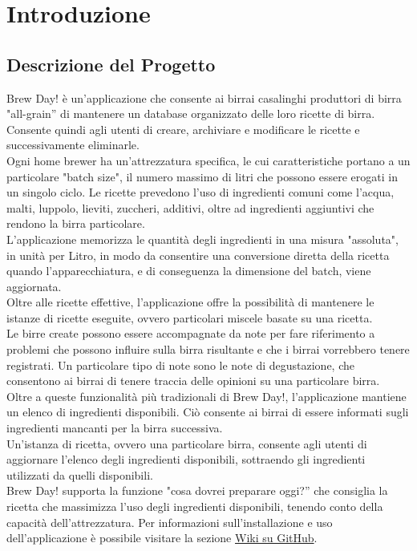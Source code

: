 \documentclass[a4paper,12pt]{report}
\begin{document}
    \newpage
   \tableofcontents
   
   \newpage
    
    
    \chapter{Introduzione}
    
    	\section{Descrizione del Progetto}	
	Brew Day! è un'applicazione che consente ai birrai casalinghi produttori di birra "all-grain” di mantenere un database organizzato delle loro ricette di birra. Consente quindi agli utenti di creare, archiviare e modificare le ricette e successivamente eliminarle.\\
Ogni home brewer ha un'attrezzatura specifica, le cui caratteristiche portano a un particolare "batch size", il numero massimo di litri che possono essere erogati in un singolo ciclo. Le ricette prevedono l’uso di ingredienti comuni come l’acqua, malti, luppolo, lieviti, zuccheri, additivi, oltre ad ingredienti aggiuntivi che rendono la birra particolare.\\
L’applicazione memorizza le quantità degli ingredienti in una misura "assoluta", in unità per Litro, in modo da consentire una conversione diretta della ricetta quando l'apparecchiatura, e di conseguenza la dimensione del batch, viene aggiornata.\\
Oltre alle ricette effettive, l'applicazione offre la possibilità di mantenere le istanze di ricette eseguite, ovvero particolari miscele basate su una ricetta.\\
Le birre create possono essere accompagnate da note per fare riferimento a problemi che possono influire sulla birra risultante e che i birrai vorrebbero tenere registrati. Un particolare tipo di note sono le note di degustazione, che consentono ai birrai di tenere traccia delle opinioni su una particolare birra.\\
Oltre a queste funzionalità più tradizionali di Brew Day!, l'applicazione mantiene un elenco di ingredienti disponibili. Ciò consente ai birrai di essere informati sugli ingredienti mancanti per la birra successiva.\\
Un'istanza di ricetta, ovvero una particolare birra, consente agli utenti di aggiornare l'elenco degli ingredienti disponibili, sottraendo gli ingredienti utilizzati da quelli disponibili.\\
Brew Day! supporta la funzione "cosa dovrei preparare oggi?” che consiglia la ricetta che massimizza l'uso degli ingredienti disponibili, tenendo conto della capacità dell'attrezzatura.
Per informazioni sull'installazione e uso dell'applicazione è possibile visitare la sezione \href{https://GitHub.com/lta-unimib/progetto-brew-day-1-brew-day-birra/wiki}{Wiki su GitHub}.
\end{document}
